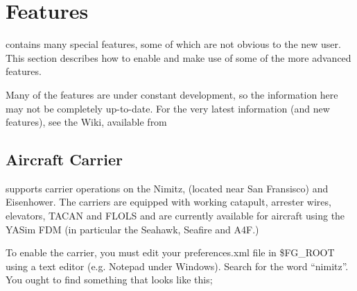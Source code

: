 
\chapter{Features\label{features}}

\FlightGear{} contains many special features, some of which are not obvious to the new user. This section
describes how to enable and make use of some of the more advanced features. 

Many of the features are under constant development, so the information here may not be completely up-to-date.
For the very latest information (and new features), see the \FlightGear{} Wiki, available from

\section{Aircraft Carrier}

\FlightGear{} supports carrier operations on the Nimitz, (located near San Fransisco) and Eisenhower. 
The carriers are equipped with working catapult, arrester wires, elevators, TACAN and FLOLS and 
are currently available for aircraft using the YASim FDM (in particular the Seahawk, Seafire and A4F.)

To enable the carrier, you must edit your preferences.xml file in \$FG\_ROOT using a text editor (e.g. Notepad
under Windows). Search for the word ``nimitz''. You ought to find something that looks like this;

